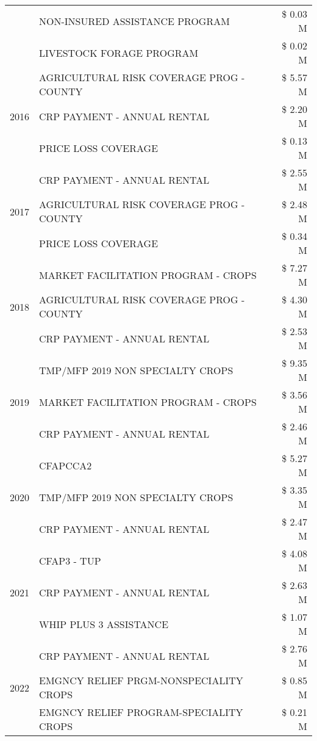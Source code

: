 \begin{tabular}{llr}
 & NON-INSURED ASSISTANCE PROGRAM & \$ 0.03 M \\
 & LIVESTOCK FORAGE PROGRAM & \$ 0.02 M \\
\cline{1-3}
\multirow[t]{3}{*}{2016} & AGRICULTURAL RISK COVERAGE PROG - COUNTY & \$ 5.57 M \\
 & CRP PAYMENT - ANNUAL RENTAL & \$ 2.20 M \\
 & PRICE LOSS COVERAGE & \$ 0.13 M \\
\cline{1-3}
\multirow[t]{3}{*}{2017} & CRP PAYMENT - ANNUAL RENTAL & \$ 2.55 M \\
 & AGRICULTURAL RISK COVERAGE PROG - COUNTY & \$ 2.48 M \\
 & PRICE LOSS COVERAGE & \$ 0.34 M \\
\cline{1-3}
\multirow[t]{3}{*}{2018} & MARKET FACILITATION PROGRAM - CROPS & \$ 7.27 M \\
 & AGRICULTURAL RISK COVERAGE PROG - COUNTY & \$ 4.30 M \\
 & CRP PAYMENT - ANNUAL RENTAL & \$ 2.53 M \\
\cline{1-3}
\multirow[t]{3}{*}{2019} & TMP/MFP 2019 NON SPECIALTY CROPS & \$ 9.35 M \\
 & MARKET FACILITATION PROGRAM - CROPS & \$ 3.56 M \\
 & CRP PAYMENT - ANNUAL RENTAL & \$ 2.46 M \\
\cline{1-3}
\multirow[t]{3}{*}{2020} & CFAPCCA2 & \$ 5.27 M \\
 & TMP/MFP 2019 NON SPECIALTY CROPS & \$ 3.35 M \\
 & CRP PAYMENT - ANNUAL RENTAL & \$ 2.47 M \\
\cline{1-3}
\multirow[t]{3}{*}{2021} & CFAP3 - TUP & \$ 4.08 M \\
 & CRP PAYMENT - ANNUAL RENTAL & \$ 2.63 M \\
 & WHIP PLUS 3 ASSISTANCE & \$ 1.07 M \\
\cline{1-3}
\multirow[t]{3}{*}{2022} & CRP PAYMENT - ANNUAL RENTAL & \$ 2.76 M \\
 & EMGNCY RELIEF PRGM-NONSPECIALITY CROPS & \$ 0.85 M \\
 & EMGNCY RELIEF PROGRAM-SPECIALITY CROPS & \$ 0.21 M \\
\cline{1-3}
\bottomrule
\end{tabular}
